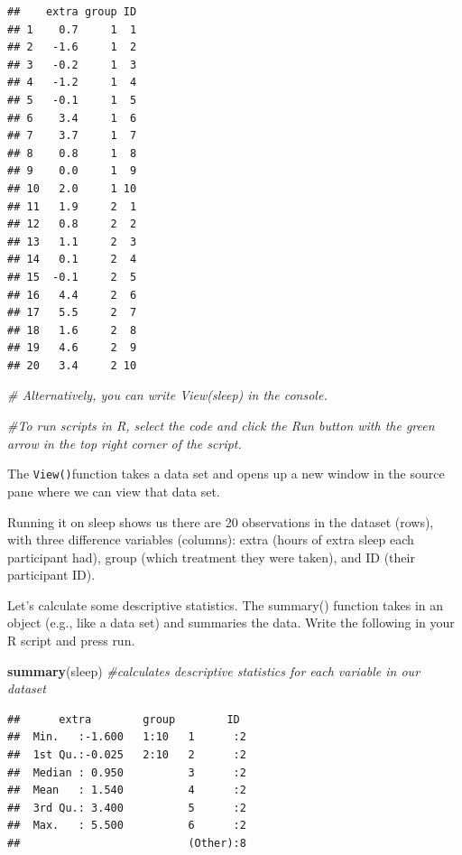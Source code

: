 \documentclass[
]{book}
\newenvironment{Shaded}{\begin{snugshade}}{\end{snugshade}}
\newcommand{\CommentTok}[1]{\textcolor[rgb]{0.56,0.35,0.01}{\textit{#1}}}
\newcommand{\FunctionTok}[1]{\textcolor[rgb]{0.13,0.29,0.53}{\textbf{#1}}}
\newcommand{\NormalTok}[1]{#1}
\begin{document}
\begin{verbatim}
##    extra group ID
## 1    0.7     1  1
## 2   -1.6     1  2
## 3   -0.2     1  3
## 4   -1.2     1  4
## 5   -0.1     1  5
## 6    3.4     1  6
## 7    3.7     1  7
## 8    0.8     1  8
## 9    0.0     1  9
## 10   2.0     1 10
## 11   1.9     2  1
## 12   0.8     2  2
## 13   1.1     2  3
## 14   0.1     2  4
## 15  -0.1     2  5
## 16   4.4     2  6
## 17   5.5     2  7
## 18   1.6     2  8
## 19   4.6     2  9
## 20   3.4     2 10
\end{verbatim}

\begin{Shaded}
\begin{Highlighting}[]
\CommentTok{\# Alternatively, you can write View(sleep) in the console. }

\CommentTok{\#To run scripts in R, select the code and click the Run button with the green arrow in the top right corner of the script. }
\end{Highlighting}
\end{Shaded}

The \texttt{View()}function takes a data set and opens up a new window in the source pane where we can view that data set.

Running it on sleep shows us there are 20 observations in the dataset (rows), with three difference variables (columns): extra (hours of extra sleep each participant had), group (which treatment they were taken), and ID (their participant ID).

Let's calculate some descriptive statistics. The summary() function takes in an object (e.g., like a data set) and summaries the data. Write the following in your R script and press run.

\begin{Shaded}
\begin{Highlighting}[]
\FunctionTok{summary}\NormalTok{(sleep) }\CommentTok{\#calculates descriptive statistics for each variable in our dataset}
\end{Highlighting}
\end{Shaded}

\begin{verbatim}
##      extra        group        ID   
##  Min.   :-1.600   1:10   1      :2  
##  1st Qu.:-0.025   2:10   2      :2  
##  Median : 0.950          3      :2  
##  Mean   : 1.540          4      :2  
##  3rd Qu.: 3.400          5      :2  
##  Max.   : 5.500          6      :2  
##                          (Other):8
\end{verbatim}
\end{document}

